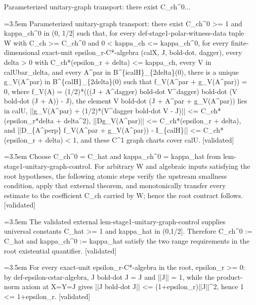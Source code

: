 \documentclass{article}
\newcommand{\step}[1]{\par\noindent\hangindent=3.5em\hangafter=1%
  \makebox[3.5em][l]{\textbf{#1.}}}
\newcommand{\steptag}[1]{\hfill{\small\textsf{[#1]}}}
\begin{document}
\begin{proofbox}{Parameterized unitary-graph transport: there exist C\_ch\textasciicircum{}0...}
\step{1} Parameterized unitary-graph transport: there exist C\_ch\textasciicircum{}0 >= 1 and kappa\_ch\textasciicircum{}0 in (0, 1/2] such that, for every def-stage1-polar-witness-data tuple W with C\_ch >= C\_ch\textasciicircum{}0 and 0 < kappa\_ch <= kappa\_ch\textasciicircum{}0, for every finite-dimensional exact-unit epsilon\_r-C*-algebra (calX, J, bold-dot, dagger), every delta > 0 with C\_ch*(epsilon\_r + delta) <= kappa\_ch, every V in calUbar\_delta, and every A\textasciicircum{}par in B\textasciicircum{}\{icalH\}\_\{2delta\}(0), there is a unique g\_V(A\textasciicircum{}par) in B\textasciicircum{}\{calH\}\_\{2delta\}(0) such that f\_V(A\textasciicircum{}par + g\_V(A\textasciicircum{}par)) = 0, where f\_V(A) = (1/2)*(((J + A\textasciicircum{}dagger) bold-dot V\textasciicircum{}dagger) bold-dot (V bold-dot (J + A)) - J), the element V bold-dot (J + A\textasciicircum{}par + g\_V(A\textasciicircum{}par)) lies in calU, ||g\_V(A\textasciicircum{}par) + (1/2)*(V\textasciicircum{}dagger bold-dot V - J)|| <= C\_ch*(epsilon\_r*delta + delta\textasciicircum{}2), ||Dg\_V(A\textasciicircum{}par)|| <= C\_ch*(epsilon\_r + delta), and ||D\_\{A\textasciicircum{}perp\} f\_V(A\textasciicircum{}par + g\_V(A\textasciicircum{}par)) - I\_\{calH\}|| <= C\_ch*(epsilon\_r + delta) < 1, and these C\textasciicircum{}1 graph charts cover calU. \steptag{validated} \\[6pt]
\step{1.1} Choose C\_ch\textasciicircum{}0 = C\_hat and kappa\_ch\textasciicircum{}0 = kappa\_hat from lem-stage1-unitary-graph-control. For arbitrary W and algebraic inputs satisfying the root hypotheses, the following atomic steps verify the upstream smallness condition, apply that external theorem, and monotonically transfer every estimate to the coefficient C\_ch carried by W; hence the root contract follows. \steptag{validated} \\[6pt]
\step{1.1.1} The validated external lem-stage1-unitary-graph-control supplies universal constants C\_hat >= 1 and kappa\_hat in (0,1/2]. Therefore C\_ch\textasciicircum{}0 := C\_hat and kappa\_ch\textasciicircum{}0 := kappa\_hat satisfy the two range requirements in the root existential quantifier. \steptag{validated} \\[4pt]
\step{1.1.2} For every exact-unit epsilon\_r-C*-algebra in the root, epsilon\_r >= 0: by def-epsilon-cstar-algebra, J bold-dot J = J and ||J|| = 1, while the product-norm axiom at X=Y=J gives ||J bold-dot J|| <= (1+epsilon\_r)||J||\textasciicircum{}2, hence 1 <= 1+epsilon\_r. \steptag{validated} \\[4pt]

\end{proofbox}
\end{document}
